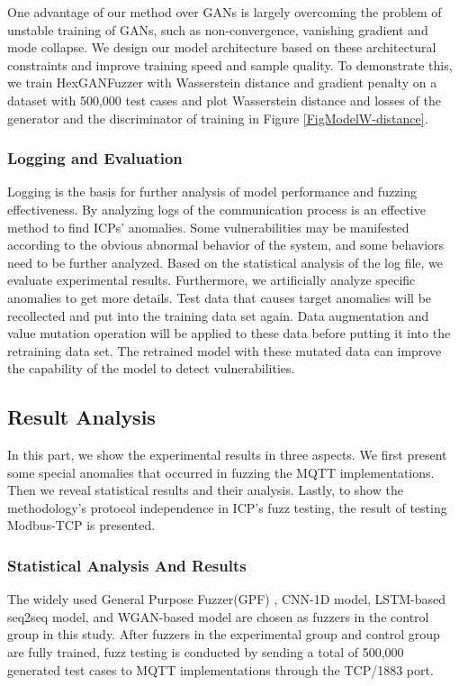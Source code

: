 One advantage of our method over GANs is largely overcoming the problem of unstable training of GANs, such as non-convergence, vanishing gradient and mode collapse. We design our model architecture based on these architectural constraints and improve training speed and sample quality. To demonstrate this, we train HexGANFuzzer with Wasserstein distance and gradient penalty on a dataset with 500,000 test cases and plot Wasserstein distance and losses of the generator and the discriminator of training in Figure \ref{FigModelW-distance}.



\subsubsection{Logging and Evaluation}
Logging is the basis for further analysis of model performance and fuzzing effectiveness. By analyzing logs of the communication process is an effective method to find ICPs’ anomalies. Some vulnerabilities may be manifested according to the obvious abnormal behavior of the system, and some behaviors need to be further analyzed. Based on the statistical analysis of the log file, we evaluate experimental results. Furthermore, we artificially analyze specific anomalies to get more details. Test data that causes target anomalies will be recollected and put into the training data set again. Data augmentation and value mutation operation will be applied to these data before putting it into the retraining data set. The retrained model with these mutated data can improve the capability of the model to detect vulnerabilities.

\subsection{Result Analysis}
In this part, we show the experimental results in three aspects. We first present some special anomalies that occurred in fuzzing the MQTT implementations. Then we reveal statistical results and their analysis. Lastly, to show the methodology’s protocol independence in ICP’s fuzz testing, the result of testing Modbus-TCP is presented.

\subsubsection{Statistical Analysis And Results}
The widely used General Purpose Fuzzer(GPF) \cite{demott2007revolutionizing}, CNN-1D model, LSTM-based seq2seq model, and WGAN-based model are chosen as fuzzers in the control group in this study. After fuzzers in the experimental group and control group are fully trained, fuzz testing is conducted by sending a total of 500,000 generated test cases to MQTT implementations through the TCP/1883 port.

